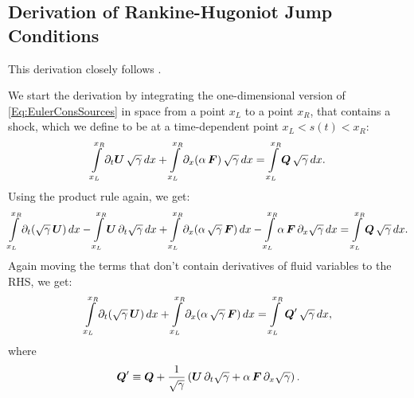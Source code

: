 \documentclass[10pt,preprint]{../aastex}
\begin{document}
\subsection{Derivation of Rankine-Hugoniot Jump Conditions}
This derivation closely follows \citet{RezzollaRelHyd}.

We start the derivation by integrating the one-dimensional version of \eqref{Eq:EulerConsSources} in space from a point $x_{L}$ to a point $x_{R}$, that contains a shock, which we define to be at a time-dependent point $x_{L}<s\left(t\right)<x_{R}$:
\begin{equation}
    \int\limits_{x_{L}}^{x_{R}}\pd{\bU}{t}\,\sqrtgm\,dx+\int\limits_{x_{L}}^{x_{R}}\pd{\left(\alpha\,\bF\right)}{x}\,\sqrtgm\,dx=\int\limits_{x_{L}}^{x_{R}}\bQ\,\sqrtgm\,dx.
\end{equation}
Using the product rule again, we get:
\begin{equation}
    \int\limits_{x_{L}}^{x_{R}}\pd{\left(\sqrtgm\,\bU\right)}{t}\,dx-\int\limits_{x_{L}}^{x_{R}}\bU\,\pd{\sqrtgm}{t}\,dx+\int\limits_{x_{L}}^{x_{R}}\pd{\left(\alpha\,\sqrtgm\,\bF\right)}{x}\,dx-\int\limits_{x_{L}}^{x_{R}}\alpha\,\bF\,\pd{\sqrtgm}{x}\,dx=\int\limits_{x_{L}}^{x_{R}}\bQ\,\sqrtgm\,dx.
\end{equation}
Again moving the terms that don't contain derivatives of fluid variables to the RHS, we get:
\begin{equation}
    \int\limits_{x_{L}}^{x_{R}}\pd{\left(\sqrtgm\,\bU\right)}{t}\,dx+\int\limits_{x_{L}}^{x_{R}}\pd{\left(\alpha\,\sqrtgm\,\bF\right)}{x}\,dx=\int\limits_{x_{L}}^{x_{R}}\,\bQ'\,\sqrtgm\,dx,
\end{equation}
where
\begin{equation}
    \bQ'\equiv\bQ+\f{1}{\sqrtgm}\left(\bU\,\pd{\sqrtgm}{t}+\alpha\,\bF\,\pd{\sqrtgm}{x}\right).
\end{equation}
\end{document}
